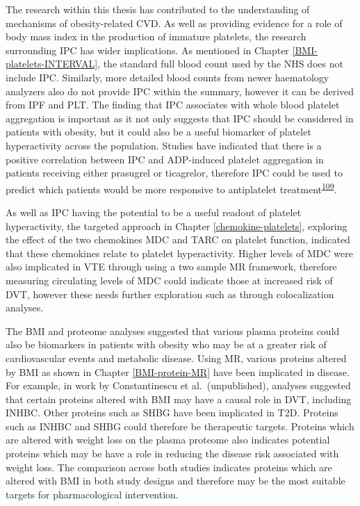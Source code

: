 \documentclass[11pt,twoside]{bristolthesis}
\begin{document}
The research within this thesis has contributed to the understanding of mechanisms of obesity-related CVD. As well as providing evidence for a role of body mass index in the production of immature platelets, the research surrounding IPC has wider implications. As mentioned in Chapter \ref{BMI-platelets-INTERVAL}, the standard full blood count used by the NHS does not include IPC. Similarly, more detailed blood counts from newer haematology analyzers also do not provide IPC within the summary, however it can be derived from IPF and PLT. The finding that IPC associates with whole blood platelet aggregation is important as it not only suggests that IPC should be considered in patients with obesity, but it could also be a useful biomarker of platelet hyperactivity across the population. Studies have indicated that there is a positive correlation between IPC and ADP-induced platelet aggregation in patients receiving either prasugrel or ticagrelor, therefore IPC could be used to predict which patients would be more responsive to antiplatelet treatment\textsuperscript{\protect\hyperlink{ref-Bernlochner2015a}{109}}.

As well as IPC having the potential to be a useful readout of platelet hyperactivity, the targeted approach in Chapter \ref{chemokine-platelets}, exploring the effect of the two chemokines MDC and TARC on platelet function, indicated that these chemokines relate to platelet hyperactivity. Higher levels of MDC were also implicated in VTE through using a two sample MR framework, therefore measuring circulating levels of MDC could indicate those at increased risk of DVT, however these needs further exploration such as through colocalization analyses.

The BMI and proteome analyses suggested that various plasma proteins could also be biomarkers in patients with obesity who may be at a greater risk of cardiovascular events and metabolic disease. Using MR, various proteins altered by BMI as shown in Chapter \ref{BMI-protein-MR} have been implicated in disease. For example, in work by Constantinescu et al.~(unpublished), analyses suggested that certain proteins altered with BMI may have a causal role in DVT, including INHBC. Other proteins such as SHBG have been implicated in T2D. Proteins such as INHBC and SHBG could therefore be therapeutic targets. Proteins which are altered with weight loss on the plasma proteome also indicates potential proteins which may be have a role in reducing the disease risk associated with weight loss. The comparison across both studies indicates proteins which are altered with BMI in both study designs and therefore may be the most suitable targets for pharmacological intervention.
\end{document}
